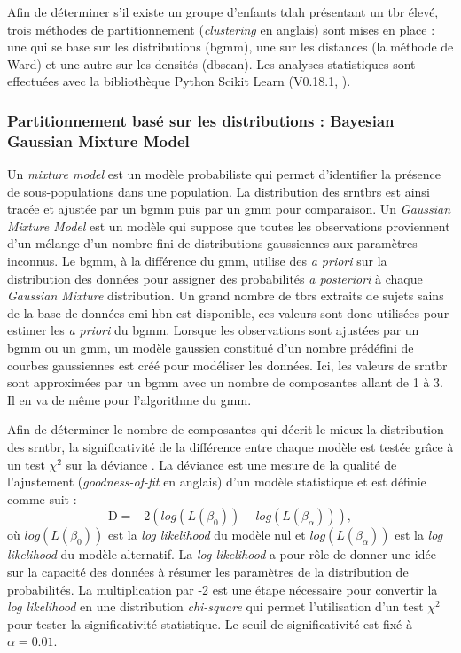 Afin de déterminer s'il existe un groupe d'enfants \gls{tdah} présentant un \gls{tbr} élevé, trois méthodes de partitionnement (\textit{clustering} en anglais) 
sont mises en place : une qui se base sur les distributions (\gls{bgmm}), une sur les distances (la méthode de Ward) et une autre sur 
les densités (\gls{dbscan}). Les analyses statistiques sont effectuées avec la bibliothèque Python Scikit Learn (V0.18.1, \citet{Pedregosa2011}).

\subsubsection{Partitionnement basé sur les distributions : Bayesian Gaussian Mixture Model} 
Un \textit{mixture model} est un modèle probabiliste qui permet d'identifier la présence de sous-populations dans une population.
La distribution des \glspl{srntbr} est ainsi tracée et ajustée par un \gls{bgmm} \citep{Attias2000, Blei2006} puis par 
un \gls{gmm} pour comparaison. Un \textit{Gaussian Mixture Model} est un modèle qui suppose que toutes les observations proviennent d'un mélange 
d'un nombre fini de distributions gaussiennes aux paramètres inconnus. 
Le \gls{bgmm}, à la différence du \gls{gmm}, utilise des \textit{a priori} sur la distribution des données pour 
assigner des probabilités \textit{a posteriori} à chaque \textit{Gaussian Mixture} distribution. Un grand nombre de \glspl{tbr} 
extraits de sujets sains de la base de données \gls{cmi-hbn} est disponible, ces valeurs sont donc utilisées pour estimer les \textit{a priori} du \gls{bgmm}. 
Lorsque les observations sont ajustées par un \gls{bgmm} ou un \gls{gmm}, un modèle gaussien constitué d'un nombre prédéfini de courbes gaussiennes est 
créé pour modéliser les données. Ici, les valeurs de \gls{srntbr} sont approximées par un \gls{bgmm} avec un nombre de composantes allant de 1 à 3. 
Il en va de même pour l'algorithme du \gls{gmm}.

Afin de déterminer le nombre de composantes qui décrit le mieux la distribution des \gls{srntbr}, la significativité de la différence entre chaque 
modèle est testée grâce à un test $\chi^2$ sur la déviance \citep{James2013}. La déviance est une mesure de la qualité de l'ajustement (\textit{goodness-of-fit} 
en anglais) d'un modèle statistique et est définie comme suit :
\begin{equation}
\label{eq:tbr_deviance}
\text{D} = -2(log(L(\beta_{0})) - log(L(\beta_{\alpha}))),
\end{equation}
où $log(L(\beta_{0}))$ est la \textit{log likelihood} du modèle nul et $log(L(\beta_{\alpha}))$ est la \textit{log likelihood} du modèle alternatif. 
La \textit{log likelihood} a pour rôle de donner une idée sur la capacité des données à résumer les paramètres de la distribution de probabilités. 
La multiplication par -2 est une étape nécessaire pour convertir la \textit{log likelihood} en une distribution \textit{chi-square} qui permet 
l'utilisation d'un test $\chi^2$ pour tester la significativité statistique. Le seuil de significativité est fixé à $\alpha = 0.01$.

